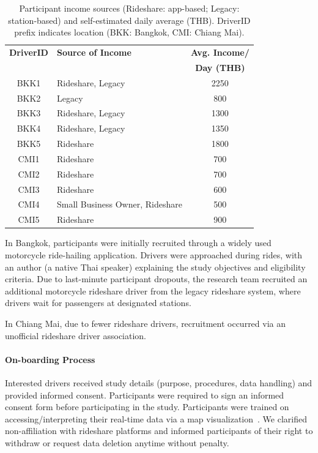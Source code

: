 \documentclass[sigconf,screen,natbib=true]{acmart}
\begin{document}
\begin{table}[ht]
    \centering
    \caption[Participant Income]{Participant income sources (Rideshare: app-based; Legacy: station-based) and self-estimated daily average (THB).
    DriverID prefix indicates location (BKK: Bangkok, CMI: Chiang Mai).}
    \begin{tabular}{|c|l|c|}
        \hline
        \textbf{DriverID} & \textbf{Source of Income} & \textbf{Avg. Income/} \\
         &  & \textbf{Day (THB)} \\
        \hline
        BKK1  & Rideshare, Legacy & 2250 \\
        BKK2  & Legacy & 800 \\
        BKK3  & Rideshare, Legacy & 1300 \\
        BKK4  & Rideshare, Legacy & 1350 \\
        BKK5  & Rideshare & 1800 \\
        CMI1  & Rideshare & 700 \\
        CMI2  & Rideshare & 700 \\
        CMI3  & Rideshare & 600 \\
        CMI4  & Small Business Owner, Rideshare & 500 \\
        CMI5  & Rideshare & 900 \\
        \hline
    \end{tabular}
\label{tab:demo}
\end{table}

In Bangkok, participants were initially recruited through a widely used motorcycle ride-hailing application. 
Drivers were approached during rides, with an author (a native Thai speaker) explaining the study objectives and eligibility criteria. 
Due to last-minute participant dropouts, the research team recruited an additional motorcycle rideshare driver from the legacy rideshare system, where drivers wait for passengers at designated stations. 


In Chiang Mai, due to fewer rideshare drivers, recruitment occurred via an unofficial rideshare driver association.


\paragraph{On-boarding Process}


Interested drivers received study details (purpose, procedures, data handling) and provided informed consent.
Participants were required to sign an informed consent form before participating in the study.
Participants were trained on accessing/interpreting their real-time data via a map visualization~\cite{mapvis}.
We clarified non-affiliation with rideshare platforms and informed participants of their right to withdraw or request data deletion anytime without penalty.
\end{document}
